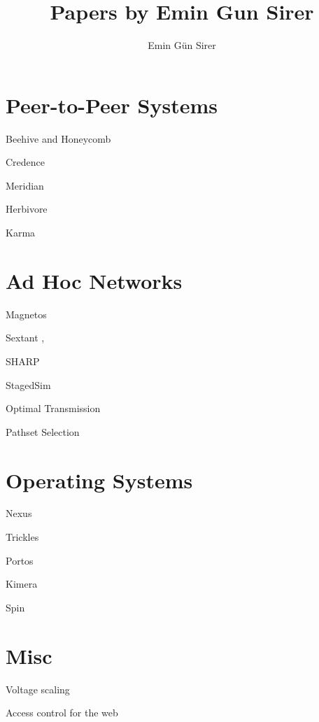 \documentclass[10pt]{article}
\title{Papers by Emin Gun Sirer}
\author{Emin G\"un Sirer}
\date{}
\begin{document}
\maketitle

\section{Peer-to-Peer Systems}

  Beehive and Honeycomb \cite{corona:login,corona,heuristicsharmful,cobweb:tr,me:rss,me:dns,codons,beehive,corsso,beehive:tr}

  Credence \cite{credence,credence:p2pecon,credence:tr}

  Meridian \cite{closestnode,meridian,meridian:tr:extended,meridian:tr}

  Herbivore \cite{herbivore,herbivore:tr,cliquenet}

  Karma \cite{karma}

\section{Ad Hoc Networks}

  Magnetos \cite{magnetos,magnetos:motivation,magnetos:tr}

  Sextant \cite{sextant},

  SHARP \cite{sharp}

  StagedSim \cite{stagedsim,stagedsim:wcs}

  Optimal Transmission \cite{optxmit}

  Pathset Selection \cite{pathset}

\section{Operating Systems}

  Nexus \cite{dan:paramselect}

  Trickles \cite{trickles}

  Portos \cite{portos}

  Kimera \cite{kimera:scp,kimera,kimera:dsl,kimera:star,kimera:sas,kimera:wcsss,kimera:esigops,kimera:tr}

  Spin \cite{sysprogm3,strands,spin:wcsss2,spin:wcsss1,spin,spin:protection,spin:osr,spin:esigops,spin:tr}

\section{Misc}

 Voltage scaling \cite{voltagescaling}

 Access control for the web \cite{webacl}



\pagebreak
\end{document}
